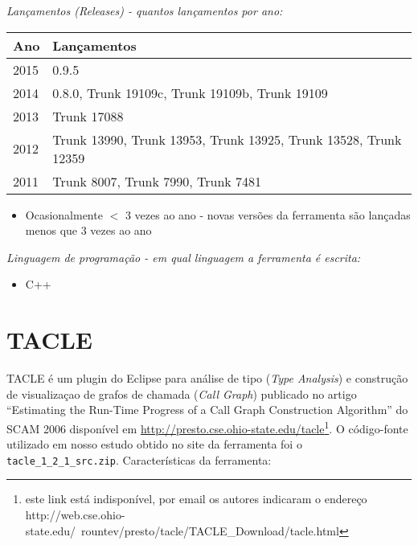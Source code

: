 \begin{description}

  \item {\it Lançamentos ({\it Releases}) - quantos lançamentos por ano:}
    \begin{table}[h!]
      \centering
      \begin{tabular}{| l | l |}
        \hline
        Ano  & Lançamentos                                                     \\
        \hline
        2015 & 0.9.5                                                           \\
        2014 & 0.8.0, Trunk 19109c, Trunk 19109b, Trunk 19109                  \\
        2013 & Trunk 17088                                                     \\
        2012 & Trunk 13990, Trunk 13953, Trunk 13925, Trunk 13528, Trunk 12359 \\
        2011 & Trunk 8007, Trunk 7990, Trunk 7481                              \\
        \hline
      \end{tabular}
    \end{table}
    \begin{itemize}
      \item Ocasionalmente $<$ 3 vezes ao ano - novas versões da ferramenta são lançadas menos que 3 vezes ao ano
    \end{itemize}

  \item {\it Linguagem de programação - em qual linguagem a ferramenta é escrita:}
    \begin{itemize}
      \item C++
    \end{itemize}

\end{description}

\section{TACLE}

TACLE é um plugin do Eclipse para análise de tipo ({\it Type Analysis}) e
construção de visualizaçao de grafos de chamada ({\it Call Graph}) publicado
no artigo ``Estimating the Run-Time Progress of a Call Graph Construction
Algorithm'' do SCAM 2006 disponível em
\url{http://presto.cse.ohio-state.edu/tacle}\footnote{este link está
indisponível, por email os autores indicaram o endereço
http://web.cse.ohio-state.edu/~rountev/presto/tacle/TACLE\_Download/tacle.html}.
O código-fonte utilizado em nosso estudo obtido no site da ferramenta foi o
\texttt{tacle\_1\_2\_1\_src.zip}. Características da ferramenta:

